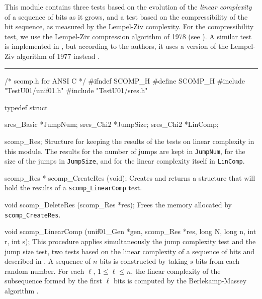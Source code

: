 
This module contains three tests based on the evolution of the 
{\em linear complexity\/} of a sequence of bits as it grows,%
and a test based on the compressibility of the bit sequence,
as measured by the Lempel-Ziv complexity.%
For the compressibility test, we use the Lempel-Ziv compression 
algorithm of 1978 (see \cite{iZIV78a}).
A similar test is implemented in \cite{rERD92a,rRUK01a},
but according to the authors, it uses a version of
the Lempel-Ziv algorithm of 1977 instead \cite{iZIV77a}.
\resdef


\bigskip
\hrule
\code\hide
/* scomp.h  for ANSI C */
#ifndef SCOMP_H
#define SCOMP_H
\endhide
#include "TestU01/unif01.h"
#include "TestU01/sres.h"
\endcode

\ifdetailed  %

\code
typedef struct {

   sres_Basic *JumpNum;
   sres_Chi2 *JumpSize;
   sres_Chi2 *LinComp;

} scomp_Res;
\endcode
 \tab
  Structure for keeping the results of the tests on linear complexity
  in this module. The results for the number of jumps are kept in
  {\tt JumpNum}, for the size of the jumps in {\tt JumpSize}, and for the
  linear complexity itself in  {\tt LinComp}.
 \endtab
\code


scomp_Res * scomp_CreateRes (void);
\endcode
 \tab 
  Creates and returns a structure that will hold the results
  of a  {\tt scomp\_LinearComp} test. 
 \endtab
\code


void scomp_DeleteRes (scomp_Res *res);
\endcode
 \tab 
  Frees the memory allocated by {\tt scomp\_CreateRes}.
 \endtab

\fi %



\code
void scomp_LinearComp (unif01_Gen *gen, scomp_Res *res,
                       long N, long n, int r, int s);
\endcode
\tab {} %
  This procedure applies simultaneously the jump complexity test and the jump 
  size test, two tests based on the linear complexity of a sequence of bits and
  described in \cite{rCAR89a,rERD92a}. A sequence of $n$ bits is constructed by
  taking $s$ bits from each random number. For each $\ell$, $1\le \ell\le n$,
  the linear complexity of the subsequence formed by the first $\ell$ bits is
  computed by the  Berlekamp-Massey algorithm \cite{mBER84a,mMAS69a}. 

